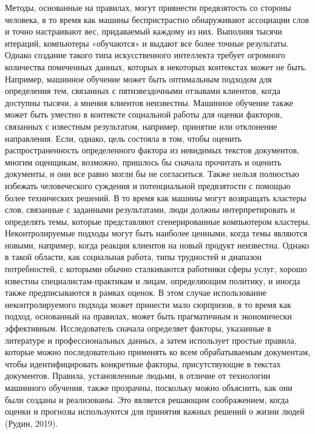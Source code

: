 \documentclass[a4paper,10pt]{article}
\begin{document}
    Методы, основанные на правилах, могут привнести предвзятость со стороны человека, в то время как машины беспристрастно обнаруживают ассоциации слов и точно настраивают вес, придаваемый каждому из них. 
    Выполняя тысячи итераций, компьютеры «обучаются» и выдают все более точные результаты. 
    Однако создание такого типа искусственного интеллекта требует огромного количества помеченных данных, которых в некоторых контекстах может не быть. 
    Например, машинное обучение может быть оптимальным подходом для определения тем, связанных с пятизвездочными отзывами клиентов, когда доступны тысячи, а мнения клиентов неизвестны. 
    Машинное обучение также может быть уместно в контексте социальной работы для оценки факторов, связанных с известным результатом, например, принятие или отклонение направления. 
    Если, однако, цель состояла в том, чтобы оценить распространенность определенного фактора из невидимых текстов документов, многим оценщикам, возможно, пришлось бы сначала прочитать и оценить документы, и они все равно могли бы не согласиться. 
    Также нельзя полностью избежать человеческого суждения и потенциальной предвзятости с помощью более технических решений. 
    В то время как машины могут возвращать кластеры слов, связанные с заданными результатами, люди должны интерпретировать и определять темы, которые представляют сгенерированные компьютером кластеры. 
    Неконтролируемые подходы могут быть наиболее ценными, когда темы являются новыми, например, когда реакция клиентов на новый продукт неизвестна. 
    Однако в такой области, как социальная работа, типы трудностей и диапазон потребностей, с которыми обычно сталкиваются работники сферы услуг, хорошо известны специалистам-практикам и лицам, определяющим политику, и иногда также предписываются в рамках оценок. 
    В этом случае использование неконтролируемого подхода может принести мало сюрпризов, в то время как подход, основанный на правилах, может быть прагматичным и экономически эффективным. 
    Исследователь сначала определяет факторы, указанные в литературе и профессиональных данных, а затем использует простые правила, которые можно последовательно применять ко всем обрабатываемым документам, чтобы идентифицировать конкретные факторы, присутствующие в текстах документов. 
    Правила, установленные людьми, в отличие от технологии машинного обучения, также прозрачны, поскольку можно объяснить, как они были созданы и реализованы. Это является решающим соображением, когда оценки и прогнозы используются для принятия важных решений о жизни людей (Рудин, 2019).
    
\end{document}
